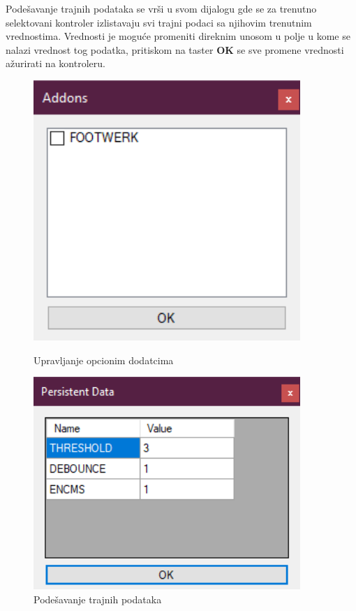 \documentclass[12pt,oneside]{memoir}
\begin{document}
	Podešavanje trajnih podataka se vrši u svom dijalogu gde se za trenutno selektovani kontroler izlistavaju svi trajni podaci sa njihovim trenutnim vrednostima. Vrednosti je moguće promeniti direknim unosom u polje u kome se nalazi vrednost tog podatka, pritiskom na taster \textbf{OK} se sve promene vrednosti ažurirati na kontroleru.
	\begin{figure}[h]
	\centering
	\begin{minipage}{0.45\textwidth}
		\centering
		\includegraphics[width=0.9\textwidth]{add} %
		\caption{Upravljanje opcionim dodatcima}
	\end{minipage}\hfill
	\begin{minipage}{0.45\textwidth}
		\centering
		\includegraphics[width=0.9\textwidth]{pers} %
		\caption{Podešavanje trajnih podataka}
	\end{minipage}
\end{figure}
\end{document}
